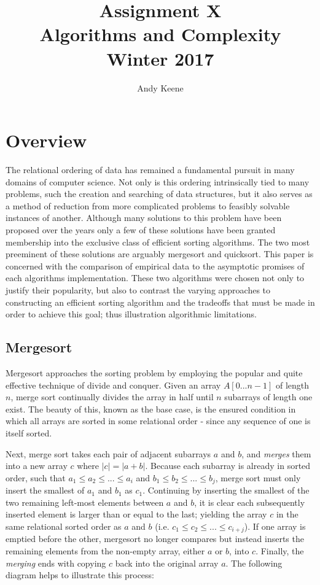 \documentclass[11pt,letterpaper]{report}
\author{Andy Keene}
\title{Assignment X\\Algorithms and Complexity\\ Winter 2017}
\date{}
\begin{document}
\section*{Overview}
The relational ordering of data has remained a fundamental pursuit in many domains of computer science. Not only is this ordering intrinsically tied to many problems, such the creation and searching of data structures, but it also serves as a method of reduction from more complicated problems to feasibly solvable instances of another. Although many solutions to this problem have been proposed over the years only a few of these solutions have been granted membership into the exclusive class of efficient sorting algorithms. The two most preeminent of these solutions are arguably mergesort and quicksort. This paper is concerned with the comparison of empirical data to the asymptotic promises of each algorithms implementation. These two algorithms were chosen not only to justify their popularity, but also to contrast the varying approaches to constructing an efficient sorting algorithm and the tradeoffs that must be made in order to achieve this goal; thus illustration algorithmic limitations.

\subsection*{Mergesort}			%
Mergesort approaches the sorting problem by employing the popular and quite effective technique of divide and conquer. Given an array $A[0...n-1]$ of length $n$, merge sort continually divides the array in half until $n$ subarrays of length one exist. The beauty of this, known as the base case, is the ensured condition in which all arrays are sorted in some relational order - since any sequence of one is itself sorted. 

Next, merge sort takes each pair of adjacent subarrays $a$ and $b$, and \emph{merges} them into a new array $c$ where $|c|=|a+b|$. Because each subarray is already in sorted order, such that $a_1 \leq a_2 \leq ... \leq a_i$ and $b_1 \leq b_2 \leq ... \leq b_j$, merge sort must only insert the smallest of $a_1$ and $b_1$ as $c_1$. Continuing by inserting the smallest of the two remaining left-most elements between $a$ and $b$, it is clear each subsequently inserted element is larger than or equal to the last; yielding the array $c$ in the same relational sorted order as $a$ and $b$ (i.e. $c_1 \leq c_2 \leq ... \leq c_{i+j}$). If one array is emptied before the other, mergesort no longer compares but instead inserts the remaining elements from the non-empty array, either $a$ or $b$, into $c$.  Finally, the \emph{merging} ends with copying $c$ back into the original array $a$. The following diagram helps to illustrate this process: 
\end{document}
